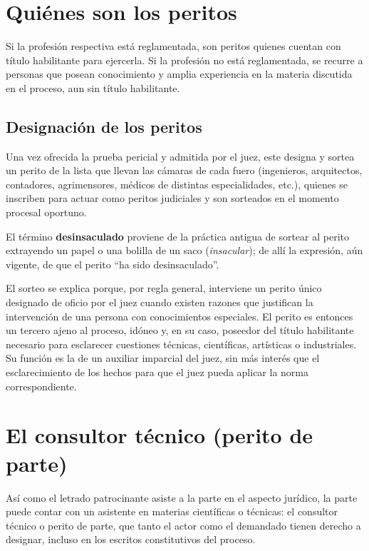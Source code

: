 \documentclass[12pt,oneside]{book}
\begin{document}
\section{Quiénes son los peritos}

Si la profesión respectiva está reglamentada, son peritos quienes cuentan con título habilitante para ejercerla. Si la profesión no está reglamentada, se recurre a personas que posean conocimiento y amplia experiencia en la materia discutida en el proceso, aun sin título habilitante.

\subsection{Designación de los peritos}

Una vez ofrecida la prueba pericial y admitida por el juez, este designa y sortea un perito de la lista que llevan las cámaras de cada fuero (ingenieros, arquitectos, contadores, agrimensores, médicos de distintas especialidades, etc.), quienes se inscriben para actuar como peritos judiciales y son sorteados en el momento procesal oportuno.

\begin{note}
El término \textbf{desinsaculado} proviene de la práctica antigua de sortear al perito extrayendo un papel o una bolilla de un saco (\textit{insacular}); de allí la expresión, aún vigente, de que el perito ``ha sido desinsaculado''.
\end{note}

El sorteo se explica porque, por regla general, interviene un perito único designado de oficio por el juez cuando existen razones que justifican la intervención de una persona con conocimientos especiales. El perito es entonces un tercero ajeno al proceso, idóneo y, en su caso, poseedor del título habilitante necesario para esclarecer cuestiones técnicas, científicas, artísticas o industriales. Su función es la de un auxiliar imparcial del juez, sin más interés que el esclarecimiento de los hechos para que el juez pueda aplicar la norma correspondiente.

\section{El consultor técnico (perito de parte)}

Así como el letrado patrocinante asiste a la parte en el aspecto jurídico, la parte puede contar con un asistente en materias científicas o técnicas: el consultor técnico o perito de parte, que tanto el actor como el demandado tienen derecho a designar, incluso en los escritos constitutivos del proceso.
\end{document}
